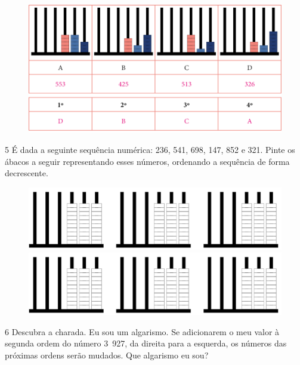 \begin{figure}[htpb!]
\includegraphics[width=\textwidth]{./media/image6.png}
\end{figure}



\num{5} É dada a seguinte sequência numérica: 236, 541, 698, 147, 852 e 321. Pinte os
ábacos a seguir representando esses números, ordenando a sequência de forma decrescente.

\begin{figure}[htpb!]
\includegraphics[width=\textwidth]{./media/image7b.png}
\includegraphics[width=\textwidth]{./media/image7b.png}
\end{figure}

\pagebreak


\num{6} Descubra a charada. Eu sou um algarismo. Se adicionarem o meu valor à
segunda ordem do número 3~927, da direita para a esquerda, os números das próximas
ordens serão mudados. Que algarismo eu sou?

